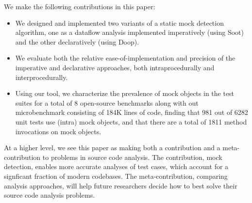 We make the following contributions in this paper:
\begin{itemize}
\item We designed and implemented two variants of a static mock detection algorithm, one as a dataflow analysis implemented imperatively (using Soot) and the other declaratively (using Doop).
\item We evaluate both the relative ease-of-implementation and precision of the imperative and declarative approaches, both intraprocedurally and interprocedurally. %
\item Using our tool, we characterize the prevalence of mock objects in the test suites for a total of 8 open-source benchmarks along with out microbenchmark consisting of 184K lines of code, finding that 981 out of 6282 unit tests use (intra) mock objects, and that there are a total of 1811 method invocations on mock objects.
\end{itemize}
At a higher level, we see this paper as making both a contribution and a meta-contribution to
problems in source code analysis. The contribution, mock detection, enables more accurate analyses
of test cases, which account for a signficant fraction of modern codebases. The meta-contribution,
comparing analysis approaches, will help future researchers decide how to best solve their
source code analysis problems.

